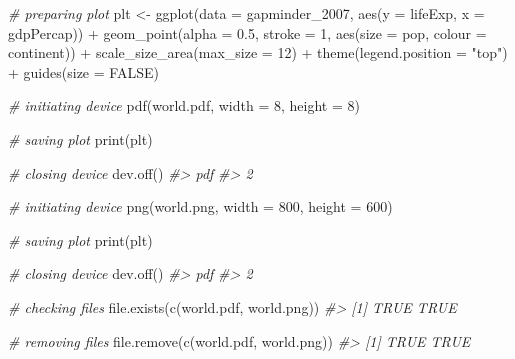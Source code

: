 \documentclass[
]{book}
\newenvironment{Shaded}{\begin{snugshade}}{\end{snugshade}}
\newcommand{\AttributeTok}[1]{\textcolor[rgb]{0.77,0.63,0.00}{#1}}
\newcommand{\CommentTok}[1]{\textcolor[rgb]{0.56,0.35,0.01}{\textit{#1}}}
\newcommand{\ConstantTok}[1]{\textcolor[rgb]{0.00,0.00,0.00}{#1}}
\newcommand{\DecValTok}[1]{\textcolor[rgb]{0.00,0.00,0.81}{#1}}
\newcommand{\FloatTok}[1]{\textcolor[rgb]{0.00,0.00,0.81}{#1}}
\newcommand{\FunctionTok}[1]{\textcolor[rgb]{0.00,0.00,0.00}{#1}}
\newcommand{\NormalTok}[1]{#1}
\newcommand{\OtherTok}[1]{\textcolor[rgb]{0.56,0.35,0.01}{#1}}
\newcommand{\SpecialCharTok}[1]{\textcolor[rgb]{0.00,0.00,0.00}{#1}}
\newcommand{\StringTok}[1]{\textcolor[rgb]{0.31,0.60,0.02}{#1}}
\begin{document}
\begin{Shaded}
\begin{Highlighting}[]
\CommentTok{\# preparing plot}
\NormalTok{plt }\OtherTok{\textless{}{-}} 
\FunctionTok{ggplot}\NormalTok{(}\AttributeTok{data =}\NormalTok{ gapminder\_2007, }\FunctionTok{aes}\NormalTok{(}\AttributeTok{y =}\NormalTok{ lifeExp, }\AttributeTok{x =}\NormalTok{ gdpPercap)) }\SpecialCharTok{+} 
  \FunctionTok{geom\_point}\NormalTok{(}\AttributeTok{alpha =} \FloatTok{0.5}\NormalTok{, }\AttributeTok{stroke =} \DecValTok{1}\NormalTok{, }\FunctionTok{aes}\NormalTok{(}\AttributeTok{size =}\NormalTok{ pop, }\AttributeTok{colour =}\NormalTok{ continent)) }\SpecialCharTok{+}
  \FunctionTok{scale\_size\_area}\NormalTok{(}\AttributeTok{max\_size =} \DecValTok{12}\NormalTok{) }\SpecialCharTok{+}
  \FunctionTok{theme}\NormalTok{(}\AttributeTok{legend.position =} \StringTok{"top"}\NormalTok{) }\SpecialCharTok{+}
  \FunctionTok{guides}\NormalTok{(}\AttributeTok{size =} \ConstantTok{FALSE}\NormalTok{) }

\CommentTok{\# initiating device}
\FunctionTok{pdf}\NormalTok{(}\StringTok{\textquotesingle{}world.pdf\textquotesingle{}}\NormalTok{, }\AttributeTok{width =} \DecValTok{8}\NormalTok{, }\AttributeTok{height =} \DecValTok{8}\NormalTok{)}

\CommentTok{\# saving plot}
\FunctionTok{print}\NormalTok{(plt)}

\CommentTok{\# closing device}
\FunctionTok{dev.off}\NormalTok{()}
\CommentTok{\#\textgreater{} pdf }
\CommentTok{\#\textgreater{}   2}

\CommentTok{\# initiating device}
\FunctionTok{png}\NormalTok{(}\StringTok{\textquotesingle{}world.png\textquotesingle{}}\NormalTok{, }\AttributeTok{width =} \DecValTok{800}\NormalTok{, }\AttributeTok{height =} \DecValTok{600}\NormalTok{)}

\CommentTok{\# saving plot}
\FunctionTok{print}\NormalTok{(plt)}

\CommentTok{\# closing device}
\FunctionTok{dev.off}\NormalTok{()}
\CommentTok{\#\textgreater{} pdf }
\CommentTok{\#\textgreater{}   2}

\CommentTok{\# checking files}
\FunctionTok{file.exists}\NormalTok{(}\FunctionTok{c}\NormalTok{(}\StringTok{\textquotesingle{}world.pdf\textquotesingle{}}\NormalTok{, }\StringTok{\textquotesingle{}world.png\textquotesingle{}}\NormalTok{))}
\CommentTok{\#\textgreater{} [1] TRUE TRUE}

\CommentTok{\# removing files}
\FunctionTok{file.remove}\NormalTok{(}\FunctionTok{c}\NormalTok{(}\StringTok{\textquotesingle{}world.pdf\textquotesingle{}}\NormalTok{, }\StringTok{\textquotesingle{}world.png\textquotesingle{}}\NormalTok{))}
\CommentTok{\#\textgreater{} [1] TRUE TRUE}
\end{Highlighting}
\end{Shaded}
\end{document}
